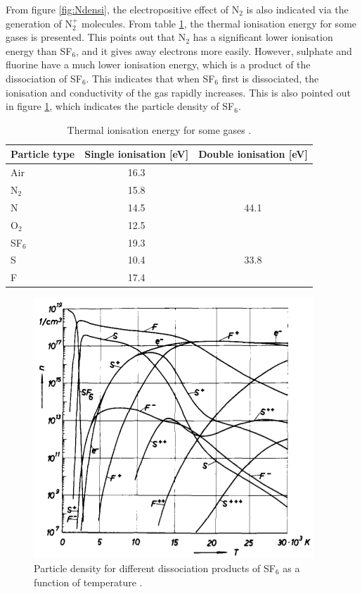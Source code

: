 \documentclass[10pt,a4paper,twoside]{article}
\begin{document}
From figure \ref{fig:Ndensi}, the electropositive effect of N$_2$ is also indicated via the generation of N$_{2}^{+}$ molecules. From table \ref{tab:thermalIonisation}, the thermal ionisation energy for some gases is presented. This points out that N$_2$ has a significant lower ionisation energy than SF$_6$, and it gives away electrons more easily. However, sulphate and fluorine have a much lower ionisation energy, which is a product of the dissociation of SF$_6$. This indicates that when SF$_6$ first is dissociated, the ionisation and conductivity of the gas rapidly increases. This is also pointed out in figure \ref{fig:SF6densi}, which indicates the particle density of SF$_6$.

\begin{table}[H]
\center
\caption{Thermal ionisation energy for some gases \cite{bib:HVEbreak}.}
\begin{tabular}{|l|c|c|}
\hline 
Particle type & Single ionisation [eV] & Double ionisation [eV] \\ 
\hline 
Air & 16.3 &  \\ 
\hline 
N$_2$ & 15.8 &  \\ 
\hline 
N & 14.5 & 44.1 \\ 
\hline 
O$_2$ & 12.5 &  \\ 
\hline 
SF$_6$ & 19.3 &  \\ 
\hline 
S & 10.4 & 33.8 \\ 
\hline 
F & 17.4 &  \\ 
\hline 
\end{tabular} 
\label{tab:thermalIonisation}
\end{table}

\begin{figure}[H]
\centering
\includegraphics[scale=0.6]{Bilder/Theory/particleDensSF6.png}
\caption{Particle density for different dissociation products of SF$_6$ as a function of temperature \cite{bib:IPSF6AQM}.} \label{fig:SF6densi}
\end{figure}
\end{document}
